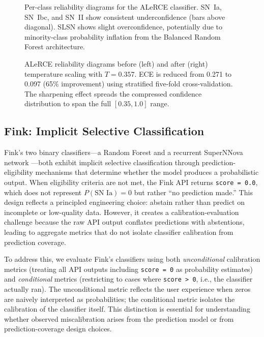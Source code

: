 \documentclass[twocolumn]{aastex631}
\begin{document}
\begin{figure}
\caption{Per-class reliability diagrams for the ALeRCE classifier. SN~Ia, SN~Ibc, and SN~II show consistent underconfidence (bars above diagonal). SLSN shows slight overconfidence, potentially due to minority-class probability inflation from the Balanced Random Forest architecture. \label{fig:alerce_perclass}}
\end{figure}

\begin{figure}
\caption{ALeRCE reliability diagrams before (left) and after (right) temperature scaling with $T = 0.357$. ECE is reduced from 0.271 to 0.097 (65\% improvement) using stratified five-fold cross-validation. The sharpening effect spreads the compressed confidence distribution to span the full $[0.35, 1.0]$ range. \label{fig:alerce_tempscaling}}
\end{figure}


\subsection{Fink: Implicit Selective Classification} \label{sec:fink}

Fink's two binary classifiers---a Random Forest \citep{leoni2022} and a recurrent SuperNNova network \citep{moller2020}---both exhibit implicit selective classification through prediction-eligibility mechanisms that determine whether the model produces a probabilistic output. When eligibility criteria are not met, the Fink API returns \texttt{score = 0.0}, which does not represent $P(\text{SN~Ia}) = 0$ but rather ``no prediction made.'' This design reflects a principled engineering choice: abstain rather than predict on incomplete or low-quality data. However, it creates a calibration-evaluation challenge because the raw API output conflates predictions with abstentions, leading to aggregate metrics that do not isolate classifier calibration from prediction coverage.

To address this, we evaluate Fink's classifiers using both \emph{unconditional} calibration metrics (treating all API outputs including \texttt{score = 0} as probability estimates) and \emph{conditional} metrics (restricting to cases where \texttt{score > 0}, i.e., the classifier actually ran). The unconditional metric reflects the user experience when zeros are naively interpreted as probabilities; the conditional metric isolates the calibration of the classifier itself. This distinction is essential for understanding whether observed miscalibration arises from the prediction model or from prediction-coverage design choices.
\end{document}
